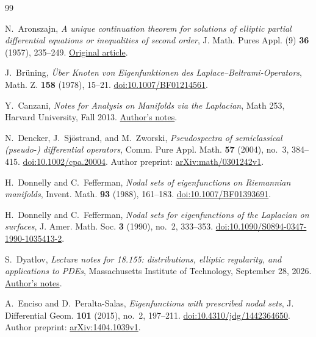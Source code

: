 \begin{thebibliography}{99}
\raggedright

N.~Aronszajn,
\emph{A unique continuation theorem for solutions of elliptic partial
differential equations or inequalities of second order},
J. Math. Pures Appl. (9) \textbf{36} (1957), 235--249.
\href{https://sites.math.washington.edu/~blwilson/Nodal/Aronszajn.pdf}
{Original article}.

J.~Br\"uning,
\emph{\"Uber Knoten von Eigenfunktionen des Laplace--Beltrami-Operators},
Math. Z. \textbf{158} (1978), 15--21.
\href{https://doi.org/10.1007/BF01214561}{doi:10.1007/BF01214561}.

Y.~Canzani,
\emph{Notes for Analysis on Manifolds via the Laplacian},
Math 253, Harvard University, Fall 2013.
\href{https://canzani.web.unc.edu/wp-content/uploads/sites/12623/2016/08/Laplacian.pdf}{Author's notes}.

N.~Dencker, J.~Sj\"ostrand, and M.~Zworski,
\emph{Pseudospectra of semiclassical (pseudo-) differential operators},
Comm. Pure Appl. Math. \textbf{57} (2004), no.~3, 384--415.
\href{https://doi.org/10.1002/cpa.20004}{doi:10.1002/cpa.20004}.
Author preprint: \href{https://arxiv.org/abs/math/0301242v1}{arXiv:math/0301242v1}.

H.~Donnelly and C.~Fefferman,
\emph{Nodal sets of eigenfunctions on Riemannian manifolds},
Invent. Math. \textbf{93} (1988), 161--183.
\href{https://doi.org/10.1007/BF01393691}{doi:10.1007/BF01393691}.

H.~Donnelly and C.~Fefferman,
\emph{Nodal sets for eigenfunctions of the Laplacian on surfaces},
J. Amer. Math. Soc. \textbf{3} (1990), no.~2, 333--353.
\href{https://doi.org/10.1090/S0894-0347-1990-1035413-2}
{doi:10.1090/S0894-0347-1990-1035413-2}.

S.~Dyatlov,
\emph{Lecture notes for 18.155: distributions, elliptic regularity,
and applications to PDEs},
Massachusetts Institute of Technology, September 28, 2026.
\href{https://math.mit.edu/~dyatlov/18.155/155-notes.pdf}{Author's notes}.

A.~Enciso and D.~Peralta-Salas,
\emph{Eigenfunctions with prescribed nodal sets},
J. Differential Geom. \textbf{101} (2015), no.~2, 197--211.
\href{https://doi.org/10.4310/jdg/1442364650}{doi:10.4310/jdg/1442364650}.
Author preprint: \href{https://arxiv.org/abs/1404.1039v1}{arXiv:1404.1039v1}.


\end{thebibliography}
